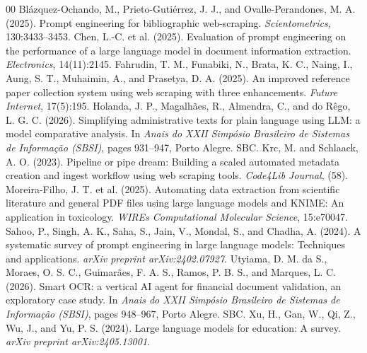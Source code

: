 \documentclass[12pt]{article}
\begin{document}
  \begin{thebibliography}{00}
   Blázquez-Ochando, M., Prieto-Gutiérrez, J. J., and Ovalle-Perandones, M. A. (2025). Prompt engineering for bibliographic web-scraping. \emph{Scientometrics}, 130:3433--3453.
   Chen, L.-C. et al. (2025). Evaluation of prompt engineering on the performance of a large language model in document information extraction. \emph{Electronics}, 14(11):2145.
   Fahrudin, T. M., Funabiki, N., Brata, K. C., Naing, I., Aung, S. T., Muhaimin, A., and Prasetya, D. A. (2025). An improved reference paper collection system using web scraping with three enhancements. \emph{Future Internet}, 17(5):195.
   Holanda, J. P., Magalhães, R., Almendra, C., and do Rêgo, L. G. C. (2026). Simplifying administrative texts for plain language using LLM: a model comparative analysis. In \emph{Anais do XXII Simpósio Brasileiro de Sistemas de Informação (SBSI)}, pages 931--947, Porto Alegre. SBC.
   Krc, M. and Schlaack, A. O. (2023). Pipeline or pipe dream: Building a scaled automated metadata creation and ingest workflow using web scraping tools. \emph{Code4Lib Journal}, (58).
   Moreira-Filho, J. T. et al. (2025). Automating data extraction from scientific literature and general PDF files using large language models and KNIME: An application in toxicology. \emph{WIREs Computational Molecular Science}, 15:e70047.
   Sahoo, P., Singh, A. K., Saha, S., Jain, V., Mondal, S., and Chadha, A. (2024). A systematic survey of prompt engineering in large language models: Techniques and applications. \emph{arXiv preprint arXiv:2402.07927}.
   Utyiama, D. M. da S., Moraes, O. S. C., Guimarães, F. A. S., Ramos, P. B. S., and Marques, L. C. (2026). Smart OCR: a vertical AI agent for financial document validation, an exploratory case study. In \emph{Anais do XXII Simpósio Brasileiro de Sistemas de Informação (SBSI)}, pages 948--967, Porto Alegre. SBC.
   Xu, H., Gan, W., Qi, Z., Wu, J., and Yu, P. S. (2024). Large language models for education: A survey. \emph{arXiv preprint arXiv:2405.13001}.
  \end{thebibliography}

  
\end{document}
